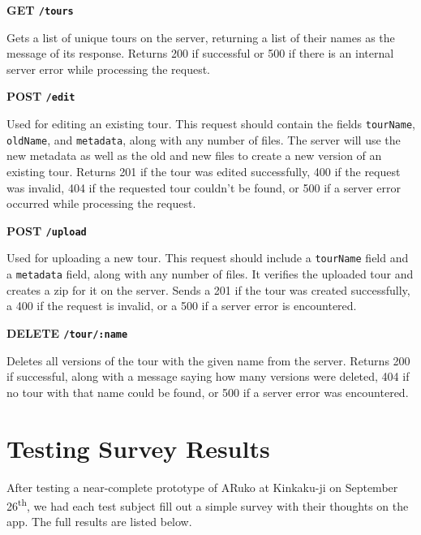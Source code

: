 \documentclass[a4paper, 10pt, american, titlepage]{article}
\newenvironment{indented}[1]%
{\begin{list}{}%
	{\setlength{\leftmargin}{#1}}%
	\item[]%
}
{\end{list}}
\begin{document}
\noindent\textbf{GET \texttt{/tours}}

\begin{indented}{1cm}
	Gets a list of unique tours on the server, returning a list of their names
	as the message of its response. Returns 200 if successful or 500 if there is
	an internal server error while processing the request.
\end{indented}

\noindent\textbf{POST \texttt{/edit}}

\begin{indented}{1cm}
	Used for editing an existing tour. This request should contain the fields
	\texttt{tourName}, \texttt{oldName}, and \texttt{metadata}, along with any
	number of files.  The server will use the new metadata as well as the old
	and new files to create a new version of an existing tour. Returns 201 if
	the tour was edited successfully, 400 if the request was invalid, 404 if the
	requested tour couldn't be found, or 500 if a server error occurred while
	processing the request.
\end{indented}

\noindent\textbf{POST \texttt{/upload}}

\begin{indented}{1cm}
	Used for uploading a new tour. This request should include a
	\texttt{tourName} field and a \texttt{metadata} field, along with any number
	of files. It verifies the uploaded tour and creates a zip for it on the
	server. Sends a 201 if the tour was created successfully, a 400 if the
	request is invalid, or a 500 if a server error is encountered.
\end{indented}

\noindent\textbf{DELETE \texttt{/tour/:name}}

\begin{indented}{1cm}
	Deletes all versions of the tour with the given name from the server.
	Returns 200 if successful, along with a message saying how many versions
	were deleted, 404 if no tour with that name could be found, or 500 if a
	server error was encountered.
\end{indented}

\clearpage

\section{Testing Survey Results}
\label{sec:testingSurveyResults}

After testing a near-complete prototype of ARuko at Kinkaku-ji on September
26\textsuperscript{th}, we had each test subject fill out a simple survey with
their thoughts on the app. The full results are listed below.
\end{document}
